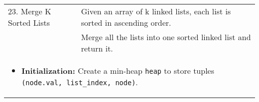 \begin{summary}
\begin{center}
\begin{tabular}{ll}
                23. Merge K Sorted Lists & Given an array of k linked lists, each list is sorted in ascending order. \\
                & Merge all the lists into one sorted linked list and return it. \\
                \multicolumn{2}{p{\linewidth}}{
                    \begin{itemize}
                        \item \textbf{Initialization:} Create a min-heap \texttt{heap} to store tuples \texttt{(node.val, list\_index, node)}.

\end{itemize}}
\end{tabular}
\end{center}
\end{summary}
